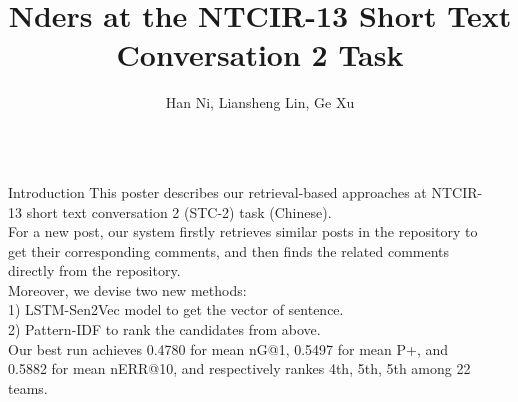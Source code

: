 \documentclass[final,hyperref={pdfpagelabels=false}]{beamer}
\title[]{Nders at the NTCIR-13 Short Text Conversation 2 Task}
\author[]{Han Ni, Liansheng Lin, Ge Xu}
\institute[ND]{NetDragon Websoft Inc.}
\begin{document}
  \begin{frame}{} 
    
      \begin{columns}[t]
        \begin{column}{.49\linewidth}
          \begin{block}{\large Introduction}
            This poster describes our retrieval-based approaches at NTCIR-13 short text conversation 2 
            (STC-2) task (Chinese). \\
            For a new post, our system firstly retrieves similar posts 
            in the repository to get their corresponding comments, and then finds the 
            related comments directly from the repository. \\ 
            Moreover, we devise two new methods: \\
            1) LSTM-Sen2Vec model to get the vector of sentence. \\
            2) Pattern-IDF to rank the candidates from above. \\
            Our best run achieves 0.4780 for mean nG@1, 
            0.5497 for mean P+, and 0.5882 for mean nERR@10, and respectively rankes 4th, 
            5th, 5th among 22 teams.
          \end{block}
        \end{column}
        \begin{column}{.49\linewidth}
\end{column}
\end{columns}
\end{frame}
\end{document}
